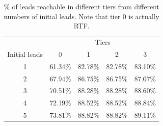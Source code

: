 \documentclass[journal]{IEEEtran}
\begin{document}
 




\begin{table}[t!]
\centering
\begin{tabular}{|c | c| c |c| c |}
\hline
			  & \multicolumn{4}{|c}{Tiers}\\
Initial leads & 0 & 1 & 2 & 3 \\
\hline
1 & 61.34\% & 82.78\% & 82.78\% & 83.10\%\\
2 & 67.94\% & 86.75\% & 86.75\% & 87.07\%\\
3 & 70.51\% & 88.28\% & 88.28\% & 88.60\%\\
4 & 72.19\% & 88.52\% & 88.52\% & 88.84\%\\
5 & 73.81\% & 88.82\% & 88.82\% & 89.11\%\\
\hline
\end{tabular}%
\caption{\label{tab:tiers}\label{tab:BTFtiers}\% of leads reachable in different tiers from different numbers of initial leads. Note that tier 0 is actually RTF. %
%
}%
\end{table}

\end{document}
